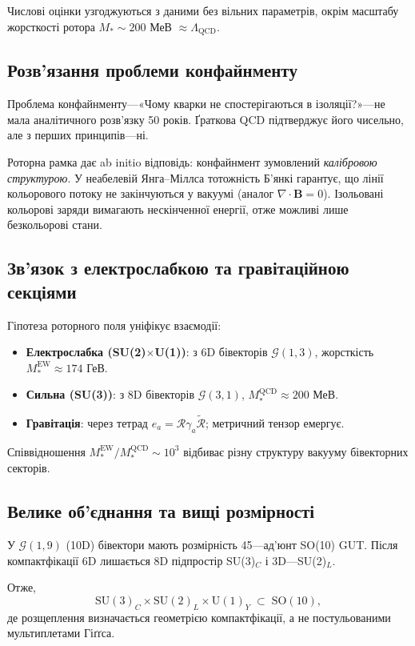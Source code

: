 \documentclass[11pt,a4paper]{article}
\newcommand{\rev}[1]{\widetilde{#1}}           %
\newcommand{\Rotor}{\mathcal{R}}
\newcommand{\Cl}{\mathcal{G}}
\newcommand{\SU}{\mathrm{SU}}
\newcommand{\UU}{\mathrm{U}}
\newcommand{\SO}{\mathrm{SO}}
\theoremstyle{definition}
\theoremstyle{plain}
\theoremstyle{remark}
\begin{document}
Числові оцінки узгоджуються з даними без вільних параметрів, окрім масштабу жорсткості ротора $M_\ast\sim 200$ МеВ $\approx \Lambda_{\mathrm{QCD}}$.

\subsection{Розв’язання проблеми конфайнменту}

Проблема конфайнменту—«Чому кварки не спостерігаються в ізоляції?»—не мала аналітичного розв’язку 50 років. Ґраткова QCD підтверджує його чисельно, але з перших принципів—ні.

Роторна рамка дає ab initio відповідь: конфайнмент зумовлений \emph{калібровою структурою}. У неабелевій Янга–Міллса тотожність Б’янкі гарантує, що лінії кольорового потоку не закінчуються у вакуумі (аналог $\nabla\cdot\mathbf{B}=0$). Ізольовані кольорові заряди вимагають нескінченної енергії, отже можливі лише безкольорові стани.

\subsection{Зв’язок з електрослабкою та гравітаційною секціями}

Гіпотеза роторного поля уніфікує взаємодії:
\begin{itemize}[leftmargin=*,itemsep=3pt]
  \item \textbf{Електрослабка (SU(2)$\times$U(1))}: з 6D бівекторів $\Cl(1,3)$, жорсткість $M_\ast^{\mathrm{EW}}\approx 174$ ГеВ.
  \item \textbf{Сильна (SU(3))}: з 8D бівекторів $\Cl(3,1)$, $M_\ast^{\mathrm{QCD}}\approx 200$ МеВ.
  \item \textbf{Гравітація}: через тетрад $e_a=\Rotor \gamma_a \rev{\Rotor}$; метричний тензор емергує.
\end{itemize}

Співвідношення $M_\ast^{\mathrm{EW}}/M_\ast^{\mathrm{QCD}}\sim 10^3$ відбиває різну структуру вакууму бівекторних секторів.

\subsection{Велике об’єднання та вищі розмірності}

У $\Cl(1,9)$ (10D) бівектори мають розмірність 45—ад’юнт SO(10) GUT. Після компактфікації 6D лишається 8D підпростір SU(3)$_C$ і 3D—SU(2)$_L$.

Отже,
\begin{equation}
\SU(3)_C \times \SU(2)_L \times \UU(1)_Y \;\subset\; \SO(10),
\end{equation}
де розщеплення визначається геометрією компактфікації, а не постульованими мультиплетами Гіґґса.
\end{document}

